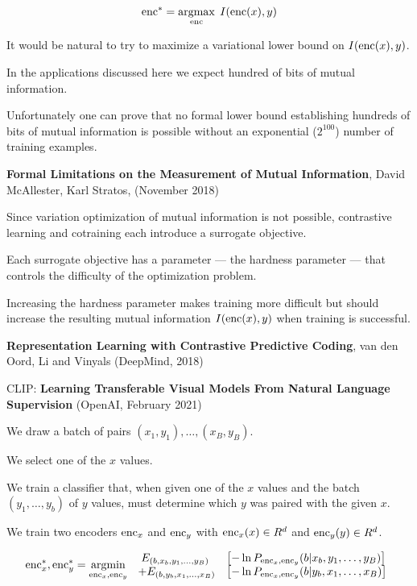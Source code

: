 {$$\mathrm{enc}^* = \operatorname*{argmax}_{\mathrm{enc}}\; I(\mathrm{enc}(x),y)$$

\vfill
{\huge
It would be natural to try to maximize a variational lower bound on $I(\mathrm{enc}(x),y)$.

\vfill
In the applications discussed here we expect hundred of bits of mutual information.

\vfill
Unfortunately one can prove that no formal lower bound
establishing hundreds of bits of mutual information  is possible without an exponential ($2^{100}$) number of training examples.

\vfill
{\bf Formal Limitations on the Measurement of Mutual Information},
David McAllester, Karl Stratos, (November 2018)
}


Since variation optimization of mutual information is not possible, contrastive learning and cotraining each introduce a surrogate objective.

\vfill
Each surrogate objective has a parameter --- the hardness parameter --- that controls the difficulty of the optimization problem.

\vfill
Increasing the hardness parameter makes training more difficult but should increase the resulting mutual information $I(\mathrm{enc}(x),y)$
when training is successful.


{\bf Representation Learning with Contrastive Predictive Coding}, van den Oord, Li and Vinyals (DeepMind, 2018)

\vfill
CLIP: {\bf Learning Transferable Visual Models From Natural Language Supervision} (OpenAI, February 2021)


We draw a batch of pairs $(x_1,y_1),\ldots,(x_B,y_B)$.

\vfill
We select one of the $x$ values.

\vfill
We train a classifier that, when given one of the $x$ values and the batch $(y_1,\ldots,y_b)$ of $y$ values, must determine which $y$ was paired with the given $x$.



We train two encoders $\mathrm{enc}_x$ and $\mathrm{enc}_y$ with $\mathrm{enc}_x(x) \in R^d$ and $\mathrm{enc}_y(y) \in R^d$.

{\huge
$$\mathrm{enc}_x^*,\mathrm{enc}_y^* = \operatorname*{argmin}_{\mathrm{enc}_x,\mathrm{enc}_y}\; \begin{array}{cl} E_{(b,x_b,y_1,\ldots,y_B)}\;&\left[-\ln P_{\mathrm{enc}_x,\mathrm{enc}_y}(b|x_b,y_1,\ldots,y_B)\right] \\
+  E_{(b,y_b,x_1,\ldots,x_B)}&\left[-\ln P_{\mathrm{enc}_x,\mathrm{enc}_y}(b|y_b,x_1,\ldots,x_B)\right]\end{array}$$

}}
